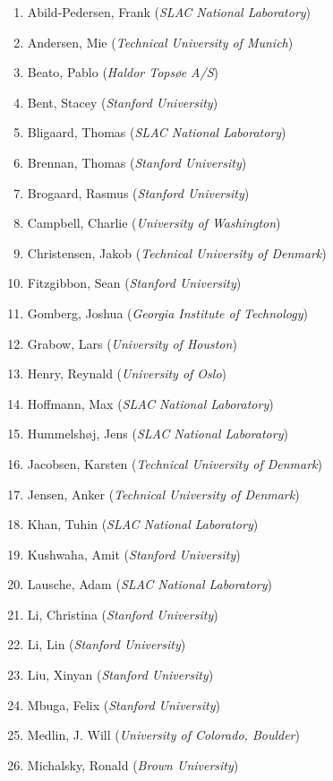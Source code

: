 \begin{enumerate}
\def\labelenumi{\arabic{enumi}.}
\itemsep1pt\parskip0pt
\item
  Abild-Pedersen, Frank (\emph{SLAC National Laboratory})
\item
  Andersen, Mie (\emph{Technical University of Munich})
\item
  Beato, Pablo (\emph{Haldor Topsøe A/S})
\item
  Bent, Stacey (\emph{Stanford University})
\item
  Bligaard, Thomas (\emph{SLAC National Laboratory})
\item
  Brennan, Thomas (\emph{Stanford University})
\item
  Brogaard, Rasmus (\emph{Stanford University})
\item
  Campbell, Charlie (\emph{University of Washington})
\item
  Christensen, Jakob (\emph{Technical University of Denmark})
\item
  Fitzgibbon, Sean (\emph{Stanford University})
\item
  Gomberg, Joshua (\emph{Georgia Institute of Technology})
\item
  Grabow, Lars (\emph{University of Houston})
\item
  Henry, Reynald (\emph{University of Oslo})
\item
  Hoffmann, Max (\emph{SLAC National Laboratory})
\item
  Hummelsh\o{}j, Jens (\emph{SLAC National Laboratory})
\item
  Jacobsen, Karsten (\emph{Technical University of Denmark})
\item
  Jensen, Anker (\emph{Technical University of Denmark})
\item
  Khan, Tuhin (\emph{SLAC National Laboratory})
\item
  Kushwaha, Amit (\emph{Stanford University})
\item
  Lausche, Adam (\emph{SLAC National Laboratory})
\item
  Li, Christina (\emph{Stanford University})
\item
  Li, Lin (\emph{Stanford University})
\item
  Liu, Xinyan (\emph{Stanford University})
\item
  Mbuga, Felix (\emph{Stanford University})
\item
  Medlin, J. Will (\emph{University of Colorado, Boulder})
\item
  Michalsky, Ronald (\emph{Brown University})

\end{enumerate}
